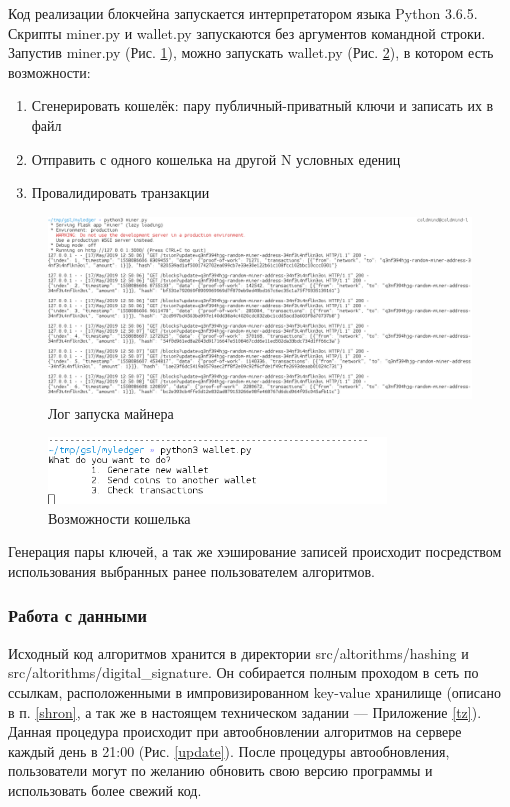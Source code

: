 Код реализации блокчейна запускается интерпретатором языка Python 3.6.5.
Скрипты {\small miner.py} и {\small wallet.py} запускаются без аргументов
командной строки. Запустив {\small miner.py} (Рис. \ref{miner_run}), можно запускать {\small
wallet.py} (Рис. \ref{wallet_run}), в котором есть возможности:
\begin{enumerate}
    \item Сгенерировать кошелёк: пару публичный-приватный ключи и записать их в файл
    \item Отправить с одного кошелька на другой N условных едениц
    \item Провалидировать транзакции
\end{enumerate}

\begin{figure}[h]
    \centering
    \includegraphics[width=\textwidth]{images/miner_run}
    \caption{Лог запуска майнера}\label{miner_run}
\end{figure}

\begin{figure}[h]
    \centering
    \includegraphics[width=0.8\textwidth]{images/wallet_run}
    \caption{Возможности кошелька}\label{wallet_run}
\end{figure}

Генерация пары ключей, а так же хэширование записей происходит посредством
использования выбранных ранее пользователем алгоритмов.

\newpage
\subsubsection{Работа с данными}\label{dannie_sheme}
Исходный код алгоритмов хранится в директории {\small src/altorithms/hashing} и
{\small src/altorithms/digital\_signature}. Он собирается полным проходом в
сеть по ссылкам, расположенными в импровизированном key-value хранилище
(описано в п. \ref{shron}, а так же в настоящем техническом задании ---
Приложение \ref{tz}). Данная процедура происходит при автообновлении алгоритмов
на сервере каждый день в 21:00 (Рис. \ref{update}). После процедуры
автообновления, пользователи могут по желанию обновить свою версию программы и
использовать более свежий код.

